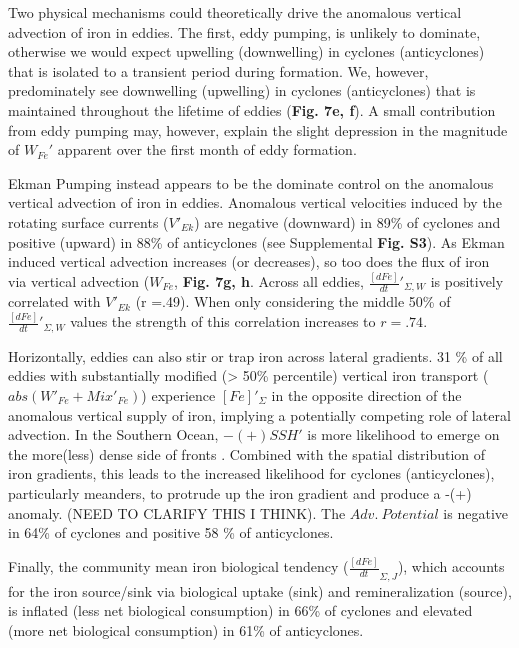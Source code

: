 Two physical mechanisms could theoretically drive the anomalous vertical advection of iron in eddies. The first, eddy pumping, is unlikely to dominate, otherwise we would expect upwelling (downwelling) in cyclones (anticyclones) that is isolated to a transient period during formation. We, however, predominately see downwelling (upwelling) in cyclones (anticyclones) that is maintained throughout the lifetime of eddies (\textbf{Fig. 7e, f}). A small contribution from eddy pumping may, however, explain the slight depression in the magnitude of $W_{Fe}'$ apparent over the first month of eddy formation. 

Ekman Pumping instead appears to be the dominate control on the anomalous vertical advection of iron in eddies. Anomalous vertical velocities induced by the rotating surface currents ($V'_{Ek}$) are negative (downward) in 89\% of cyclones and positive (upward) in 88\% of anticyclones (see Supplemental \textbf{Fig. S3}). As Ekman induced vertical advection increases (or decreases), so too does the flux of iron via vertical advection ($W_{Fe}$, \textbf{Fig. 7g, h}. Across all eddies, $\frac{[dFe]}{dt}'_{\Sigma, W}$ is positively correlated with $V'_{Ek}$ (r =.49). When only considering the middle 50\% of $\frac{[dFe]}{dt}'_{\Sigma, W}$ values the strength of this correlation increases to $r=.74$. 

Horizontally, eddies can also stir or trap iron across lateral gradients. 31 \% of all eddies with substantially modified (> 50\% percentile) vertical iron transport ($abs(W'_{Fe}+Mix'_{Fe})$) experience $[Fe]'_\Sigma$ in the opposite direction of the anomalous vertical supply of iron, implying a potentially competing role of lateral advection. In the Southern Ocean, $-(+)SSH'$ is more likelihood to emerge on the more(less) dense side of fronts \parencite{SongSeasonalvariationcorrelation2018}. Combined with the spatial distribution of iron gradients, this leads to the increased likelihood for cyclones (anticyclones), particularly meanders, to protrude up the iron gradient and produce a -(+) anomaly. (NEED TO CLARIFY THIS I THINK). The $Adv. \ Potential$  is negative in 64\% of cyclones and positive 58 \% of anticyclones.  

Finally, the community mean iron biological tendency ($\frac{[dFe]}{dt}_{\Sigma, J}$), which accounts for the iron source/sink via biological uptake (sink) and remineralization (source), is inflated (less net biological consumption) in 66\% of cyclones and elevated (more net biological consumption) in 61\% of anticyclones.

